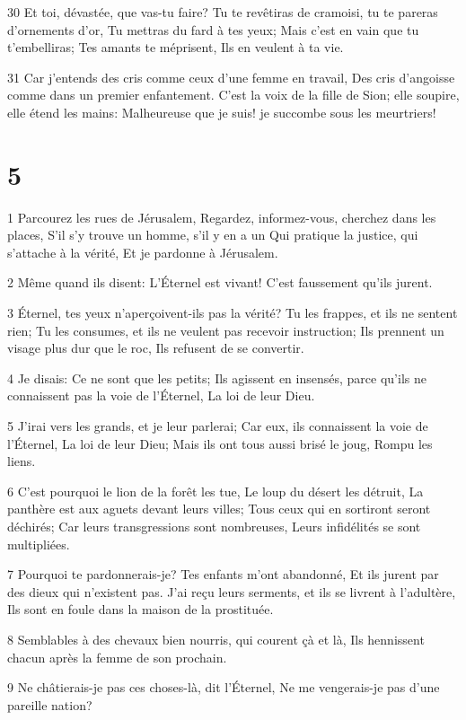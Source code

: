 \par 30 Et toi, dévastée, que vas-tu faire? Tu te revêtiras de cramoisi, tu te pareras d'ornements d'or, Tu mettras du fard à tes yeux; Mais c'est en vain que tu t'embelliras; Tes amants te méprisent, Ils en veulent à ta vie.
\par 31 Car j'entends des cris comme ceux d'une femme en travail, Des cris d'angoisse comme dans un premier enfantement. C'est la voix de la fille de Sion; elle soupire, elle étend les mains: Malheureuse que je suis! je succombe sous les meurtriers!

\chapter{5}

\par 1 Parcourez les rues de Jérusalem, Regardez, informez-vous, cherchez dans les places, S'il s'y trouve un homme, s'il y en a un Qui pratique la justice, qui s'attache à la vérité, Et je pardonne à Jérusalem.
\par 2 Même quand ils disent: L'Éternel est vivant! C'est faussement qu'ils jurent.
\par 3 Éternel, tes yeux n'aperçoivent-ils pas la vérité? Tu les frappes, et ils ne sentent rien; Tu les consumes, et ils ne veulent pas recevoir instruction; Ils prennent un visage plus dur que le roc, Ils refusent de se convertir.
\par 4 Je disais: Ce ne sont que les petits; Ils agissent en insensés, parce qu'ils ne connaissent pas la voie de l'Éternel, La loi de leur Dieu.
\par 5 J'irai vers les grands, et je leur parlerai; Car eux, ils connaissent la voie de l'Éternel, La loi de leur Dieu; Mais ils ont tous aussi brisé le joug, Rompu les liens.
\par 6 C'est pourquoi le lion de la forêt les tue, Le loup du désert les détruit, La panthère est aux aguets devant leurs villes; Tous ceux qui en sortiront seront déchirés; Car leurs transgressions sont nombreuses, Leurs infidélités se sont multipliées.
\par 7 Pourquoi te pardonnerais-je? Tes enfants m'ont abandonné, Et ils jurent par des dieux qui n'existent pas. J'ai reçu leurs serments, et ils se livrent à l'adultère, Ils sont en foule dans la maison de la prostituée.
\par 8 Semblables à des chevaux bien nourris, qui courent çà et là, Ils hennissent chacun après la femme de son prochain.
\par 9 Ne châtierais-je pas ces choses-là, dit l'Éternel, Ne me vengerais-je pas d'une pareille nation?
